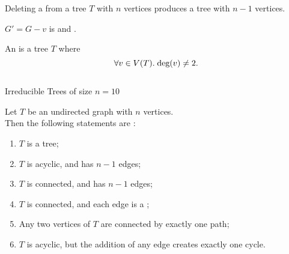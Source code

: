 \begin{frame}{}
  \begin{lemma}
    Deleting a  from a tree $T$ with $n$ vertices
    produces a tree with $n-1$ vertices.
  \end{lemma}

  \pause
  \vspace{0.30cm}
  \begin{center}

    \vspace{0.20cm}
    $G' = G - v$ is  and .

    \pause
    \vspace{0.50cm}
  \end{center}
\end{frame}

\begin{frame}{}
  \begin{definition}
    An  is a tree $T$ where
    \[
      \forall v \in V(T).\; \text{deg}(v) \neq 2.
    \]
  \end{definition}

  \pause
  \vspace{0.30cm}
  \begin{columns}
      \pause
  \end{columns}

  \pause
  \vspace{0.30cm}
  \begin{center}
     Irreducible Trees of size $n = 10$
  \end{center}
\end{frame}

\begin{frame}{}
  \begin{theorem}
    Let $T$ be an undirected graph with $n$ vertices. \\[3pt]
    Then the following statements are :
    \begin{enumerate}[(1)]
      \setlength{\itemsep}{6pt}
      \item $T$ is a tree;
      \item $T$ is acyclic, and has $n-1$ edges;
      \item $T$ is connected, and has $n-1$ edges;
      \item $T$ is connected, and each edge is a ;
      \item Any two vertices of $T$ are connected by exactly one path;
      \item $T$ is acyclic, but the addition of any edge creates exactly one cycle.
    \end{enumerate}
  \end{theorem}
\end{frame}

